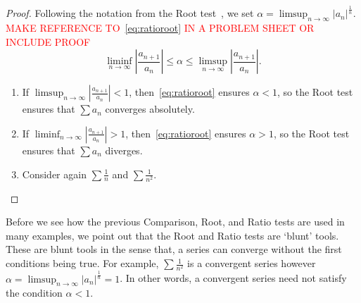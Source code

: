 \begin{proof}
	Following the notation from the Root test~, we set $\alpha = \limsup_{n\to\infty} |a_n|^\frac{1}{n}$. \textcolor{red}{MAKE REFERENCE TO~\eqref{eq:ratioroot} IN A PROBLEM SHEET OR INCLUDE PROOF}
	\begin{equation}
		\label{eq:ratioroot}
		\liminf_{n\to \infty}\left|\frac{a_{n+1}}{a_n}\right| \le \alpha \le \limsup_{n\to \infty}\left|\frac{a_{n+1}}{a_n}\right|.
	\end{equation}
	\begin{enumerate}[label=\textbf{Ratio \arabic*)}]
		\item If $\limsup_{n\to \infty}\left|\frac{a_{n+1}}{a_n}\right| <1$, then~\eqref{eq:ratioroot} ensures $\alpha <1$, so the Root test~ ensures that $\sum a_n$ converges absolutely.
		\item If $\liminf_{n\to \infty}\left|\frac{a_{n+1}}{a_n}\right|>1$, then~\eqref{eq:ratioroot} ensures $\alpha >1$, so the Root test~ ensures that $\sum a_n$ diverges.
		\item Consider again $\sum \frac{1}{n}$ and $\sum \frac{1}{n^2}$.
	\end{enumerate}
\end{proof}
Before we see how the previous Comparison, Root, and Ratio tests are used in many examples, we point out that the Root and Ratio tests are `blunt' tools. These are blunt tools in the sense that, a series can converge without the first conditions being true. For example, $\sum \frac{1}{n^2}$ is a convergent series however $\alpha = \limsup_{n\to \infty}|a_n|^\frac{1}{n} = 1$. In other words, a convergent series need not satisfy the condition $\alpha<1$.
